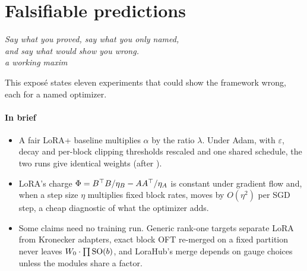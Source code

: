 \section{Falsifiable predictions}\label{sec:predictions}

\begin{flushright}
\small\itshape Say what you proved, say what you only named,\\
and say what would show you wrong.\\[2pt]
{\upshape\footnotesize a working maxim}
\end{flushright}

This exposé states eleven experiments that could show the framework wrong, each for a named optimizer.

\paragraph{In brief}
\begin{itemize}
  \item A fair LoRA+ baseline multiplies $\alpha$ by the ratio $\lambda$. Under Adam, with $\varepsilon$, decay and
    per-block clipping thresholds rescaled and one shared schedule, the two runs give identical weights (after
    \citealp{schulman2025lora}).
  \item LoRA's charge $\Phi=B^{\top} B/\eta_B-AA^{\top}/\eta_A$ is constant under gradient flow and, when a step size $\eta$
    multiplies fixed block rates, moves by $O(\eta^2)$ per SGD step, a cheap diagnostic of what the optimizer adds.
  \item Some claims need no training run. Generic rank-one targets separate LoRA from Kronecker adapters, exact block
    OFT re-merged on a fixed partition never leaves $W_0\cdot\prod\mathrm{SO}(b)$, and LoraHub's merge depends on gauge choices
    unless the modules share a factor.
\end{itemize}

\newenvironment{predmeta}{\par\small\begin{description}[font=\normalfont,leftmargin=0pt,labelindent=0pt,
  itemsep=2pt,topsep=5pt,parsep=0pt,labelsep=0.6em]}{\end{description}}
\newcommand{\predfield}[1]{\item[\labelsf{#1}]}

